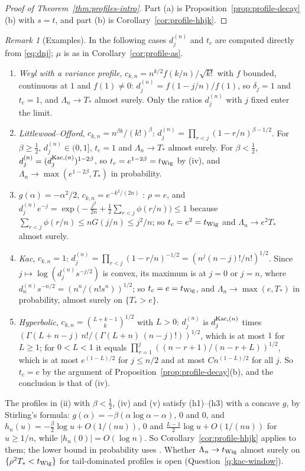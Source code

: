 \documentclass[11pt]{amsart}
\theoremstyle{definition}
\theoremstyle{remark}
\newtheorem{remark}[theorem]{Remark}
\numberwithin{equation}{section}
\begin{document}
\begin{proof}[Proof of Theorem~\ref{thm:profiles-intro}]
Part (a) is Proposition~\ref{prop:profile-decay}(b) with $s=t$, and part (b) is Corollary~\ref{cor:profile-hhjk}.
\end{proof}

\begin{remark}[Examples]\label{rem:profile-examples}
In the following cases $d^{(n)}_j$ and $t_c$ are computed directly from \eqref{eq:dnj}; $\mu$ is as in Corollary~\ref{cor:profile-as}.
\begin{enumerate}
\item[(i)] \emph{Weyl with a variance profile}, $c_{k,n}=n^{k/2}f(k/n)/\sqrt{k!}$ with $f$ bounded, continuous at $1$ and $f(1)\ne0$: $d^{(n)}_j=f(1-j/n)/f(1)$, so $\delta_j=1$ and $t_c=1$, and $\Lambda_n\to T_*$ almost surely. Only the ratios $d^{(n)}_j$ with $j$ fixed enter the limit.
\item[(ii)] \emph{Littlewood--Offord}, $c_{k,n}=n^{\beta k}/(k!)^\beta$: $d^{(n)}_j=\prod_{r<j}(1-r/n)^{\beta-1/2}$. For $\beta\ge\frac12$, $d^{(n)}_j\in(0,1]$, $t_c=1$ and $\Lambda_n\to T_*$ almost surely. For $\beta<\frac12$, $d^{(n)}_j=(d^{{\rm Kac},(n)}_j)^{1-2\beta}$, so $t_c=e^{1-2\beta}=t_{\rm Wig}$ by (iv), and $\Lambda_n\to\max(e^{1-2\beta},T_*)$ in probability.
\item[(iii)] $g(\alpha)=-\alpha^2/2$, $c_{k,n}=e^{-k^2/(2n)}$ \cite[Section~4.4]{HHJK}: $\rho=e$, and $d^{(n)}_je^{-j}=\exp\bigl(-\frac{j^2}{2n}+\frac12\sum_{r<j}\phi(r/n)\bigr)\le1$ because $\sum_{r<j}\phi(r/n)\le nG(j/n)\le j^2/n$; so $t_c=e^2=t_{\rm Wig}$ and $\Lambda_n\to e^2T_*$ almost surely.
\item[(iv)] \emph{Kac}, $c_{k,n}=1$: $d^{(n)}_j=\prod_{r<j}(1-r/n)^{-1/2}=(n^j(n-j)!/n!)^{1/2}$. Since $j\mapsto\log(d^{(n)}_js^{-j/2})$ is convex, its maximum is at $j=0$ or $j=n$, where $d^{(n)}_ns^{-n/2}=(n^n/(n!s^n))^{1/2}$; so $t_c=e=t_{\rm Wig}$, and $\Lambda_n\to\max(e,T_*)$ in probability, almost surely on $\{T_*>e\}$.
\item[(v)] \emph{Hyperbolic}, $c_{k,n}=\binom{L+k-1}k^{1/2}$ with $L>0$: $d^{(n)}_j$ is $d^{{\rm Kac},(n)}_j$ times $(\Gamma(L+n-j)\,n!/(\Gamma(L+n)\,(n-j)!))^{1/2}$, which is at most $1$ for $L\ge1$; for $0<L<1$ it equals $\prod_{r=1}^{j}((n-r+1)/(n-r+L))^{1/2}$, which is at most $e^{(1-L)/2}$ for $j\le n/2$ and at most $Cn^{(1-L)/2}$ for all $j$. So $t_c=e$ by the argument of Proposition~\ref{prop:profile-decay}(b), and the conclusion is that of (iv).
\end{enumerate}
The profiles in (ii) with $\beta<\frac12$, (iv) and (v) satisfy (h1)--(h3) with a concave $g$, by Stirling's formula: $g(\alpha)=-\beta(\alpha\log\alpha-\alpha)$, $0$ and $0$, and $h_n(u)=-\frac\beta2\log u+O(1/(nu))$, $0$ and $\frac{L-1}2\log u+O(1/(nu))$ for $u\ge1/n$, while $|h_n(0)|=O(\log n)$. So Corollary~\ref{cor:profile-hhjk} applies to them; the lower bound in probability uses \cite[Theorem~2.12]{HHJK}. Whether $\Lambda_n\to t_{\rm Wig}$ almost surely on $\{\rho^2T_*<t_{\rm Wig}\}$ for tail-dominated profiles is open (Question~\ref{q:kac-window}).
\end{remark}
\end{document}
